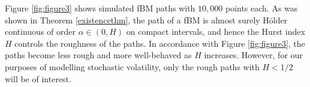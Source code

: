Figure \ref{fig:figure3} shows simulated fBM paths with $10,000$ points each. As was shown in Theorem \ref{existencethm}, the path of a fBM is almost surely Hölder continuous of order $\alpha\in(0,H)$ on compact intervals, and hence the Hurst index $H$ controls the roughness of the paths. In accordance with Figure \ref{fig:figure3}, the paths become less rough and more well-behaved as $H$ increases. However, for our purposes of modelling stochastic volatility, only the rough paths with $H<1/2$ will be of interest.

